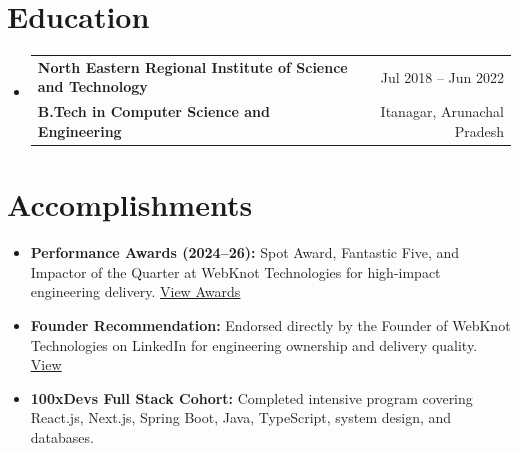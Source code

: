 \documentclass[letterpaper,10pt]{article}
\makeatletter
\newcommand{\resumeItem}[1]{
  \item\normalsize{#1 \vspace{-3pt}}
}
\newcommand{\resumeSubheading}[4]{
  \vspace{-2pt}\item
    \begin{tabular*}{1.0\textwidth}[t]{l@{\extracolsep{\fill}}r}
      \textbf{#1} & \normalsize #2 \\
      \textbf{\normalsize#3} & \normalsize #4 \\
    \end{tabular*}\vspace{-7pt}
}
\newcommand{\resumeSubHeadingListStart}{\begin{itemize}[leftmargin=0.0in, label={}]}
\newcommand{\resumeSubHeadingListEnd}{\end{itemize}}
\newcommand{\resumeItemListStart}{\begin{itemize}[leftmargin=0.15in]}
\newcommand{\resumeItemListEnd}{\end{itemize}\vspace{-5pt}}
\makeatother
\begin{document}
\section{Education}
\resumeSubHeadingListStart
\resumeSubheading
  {North Eastern Regional Institute of Science and Technology}{Jul 2018 -- Jun 2022}
  {\normalfont B.Tech in Computer Science and Engineering}{Itanagar, Arunachal Pradesh}
\resumeSubHeadingListEnd
\vspace{-9pt}

\section{Accomplishments}
\resumeItemListStart
  \resumeItem{\textbf{Performance Awards (2024--26):} Spot Award, Fantastic Five, and Impactor of the Quarter at WebKnot Technologies for high-impact engineering delivery. \href{https://drive.google.com/drive/folders/1b31Splf6_z8zsI4cy17kcNF-3EIpSdGw?usp=sharing}{\underline{View Awards}}}
  \resumeItem{\textbf{Founder Recommendation:} Endorsed directly by the Founder of WebKnot Technologies on LinkedIn for engineering ownership and delivery quality. \href{https://www.linkedin.com/in/mayankmishracse/details/recommendations/}{\underline{View}}}
  \resumeItem{\textbf{100xDevs Full Stack Cohort:} Completed intensive program covering React.js, Next.js, Spring Boot, Java, TypeScript, system design, and databases.}
\resumeItemListEnd
\end{document}
